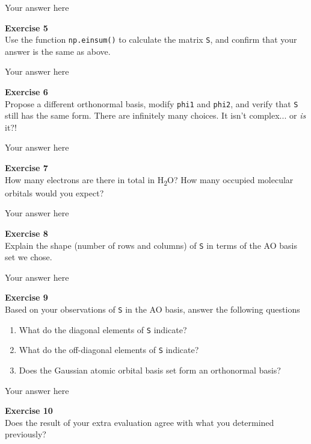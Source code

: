 \documentclass{article}
\begin{document}
Your answer here

\begin{mdframed}
\textbf{Exercise 5}\\
Use the function \texttt{np.einsum()} to calculate the matrix \texttt{S}, and confirm that your answer is the same as above.
\end{mdframed}

Your answer here

\begin{mdframed}
\textbf{Exercise 6}\\
Propose a different orthonormal basis, modify \texttt{phi1} and \texttt{phi2}, and verify that \texttt{S} still has the same form. There are infinitely many choices. It isn't complex... or \textit{is} it?!
\end{mdframed}

Your answer here

\begin{mdframed}
\textbf{Exercise 7}\\
How many electrons are there in total in H\textsubscript{2}O?
How many occupied molecular orbitals would you expect?
\end{mdframed}

Your answer here

\begin{mdframed}
\textbf{Exercise 8}\\
Explain the shape (number of rows and columns) of \texttt{S} in terms of the AO basis set we chose.
\end{mdframed}

Your answer here

\begin{mdframed}
\textbf{Exercise 9}\\
Based on your observations of \texttt{S} in the AO basis, answer the following questions

\begin{enumerate}
\item What do the diagonal elements of \texttt{S} indicate?
\item What do the off-diagonal elements of \texttt{S} indicate?
\item Does the Gaussian atomic orbital basis set form an orthonormal basis?
\end{enumerate}
\end{mdframed}

Your answer here

\begin{mdframed}
\textbf{Exercise 10}\\
Does the result of your extra evaluation agree with what you determined previously?
\end{mdframed}
\end{document}
